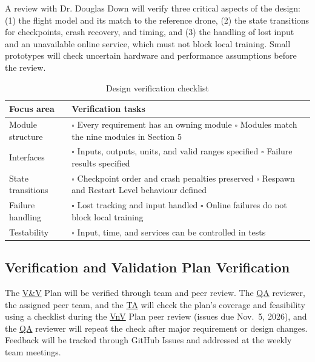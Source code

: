 \documentclass[12pt, titlepage]{article}
\begin{document}
A review with Dr. Douglas Down will verify three critical aspects of the design: (1) the
flight model and its match to the reference drone, (2) the state transitions for
checkpoints, crash recovery, and timing, and (3) the handling of lost input and an
unavailable online service, which must not block local training. Small prototypes will
check uncertain hardware and performance assumptions before the review.

\begin{table}[!htbp]
\centering
\caption{Design verification checklist}
\label{tab:design-checklist}
\renewcommand{\arraystretch}{1.3}
\begin{tabularx}{\textwidth}{@{}>{\raggedright\arraybackslash}p{}>{\raggedright\arraybackslash}X@{}}
\toprule
\textbf{Focus area} & \textbf{Verification tasks} \\
\midrule
Module structure &
\(\square\) Every requirement has an owning module\newline
\(\square\) Modules match the nine modules in Section 5 \\
Interfaces &
\(\square\) Inputs, outputs, units, and valid ranges specified\newline
\(\square\) Failure results specified \\
State transitions &
\(\square\) Checkpoint order and crash penalties preserved\newline
\(\square\) Respawn and Restart Level behaviour defined \\
Failure handling &
\(\square\) Lost tracking and input handled\newline
\(\square\) Online failures do not block local training \\
Testability &
\(\square\) Input, time, and services can be controlled in tests \\
\bottomrule
\end{tabularx}
\end{table}

\subsection{Verification and Validation Plan Verification}

The \hyperlink{abbr:VnV}{V\&V} Plan will be verified through team and peer review. The \hyperlink{abbr:QA}{QA} reviewer, the
assigned peer team, and the \hyperlink{abbr:TA}{TA} will check the plan's coverage and feasibility using a
checklist during the \hyperlink{abbr:VnV}{VnV} Plan peer review (issues due Nov.~5, 2026), and the \hyperlink{abbr:QA}{QA} reviewer
will repeat the check after major requirement or design changes. Feedback will be
tracked through GitHub Issues and addressed at the weekly team meetings.
\end{document}

